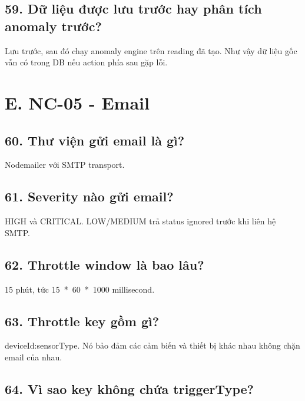\documentclass[11pt,oneside,openany]{book}
\renewcommand{\texttt}[1]{{\ttfamily\small #1}}
\begin{document}
\subsection{59. Dữ liệu được lưu trước hay phân tích anomaly
trước?}\label{59-dux1eef-liux1ec7u-ux111ux1b0ux1ee3c-lux1b0u-trux1b0ux1edbc-hay-phuxe2n-tuxedch-anomaly-trux1b0ux1edbc}

Lưu trước, sau đó chạy anomaly engine trên reading đã tạo. Như vậy dữ
liệu gốc vẫn có trong DB nếu action phía sau gặp lỗi.

\section{E. NC-05 - Email}\label{e-nc-05---email}

\subsection{60. Thư viện gửi email là
gì?}\label{60-thux1b0-viux1ec7n-gux1eedi-email-luxe0-guxec}

Nodemailer với SMTP transport.

\subsection{61. Severity nào gửi
email?}\label{61-severity-nuxe0o-gux1eedi-email}

HIGH và CRITICAL. LOW/MEDIUM trả status \texttt{ignored} trước khi liên
hệ SMTP.

\subsection{62. Throttle window là bao
lâu?}\label{62-throttle-window-luxe0-bao-luxe2u}

15 phút, tức \texttt{15\ *\ 60\ *\ 1000} millisecond.

\subsection{63. Throttle key gồm
gì?}\label{63-throttle-key-gux1ed3m-guxec}

\texttt{deviceId:sensorType}. Nó bảo đảm các cảm biến và thiết bị khác
nhau không chặn email của nhau.

\subsection{64. Vì sao key không chứa
triggerType?}\label{64-vuxec-sao-key-khuxf4ng-chux1ee9a-triggertype}
\end{document}
